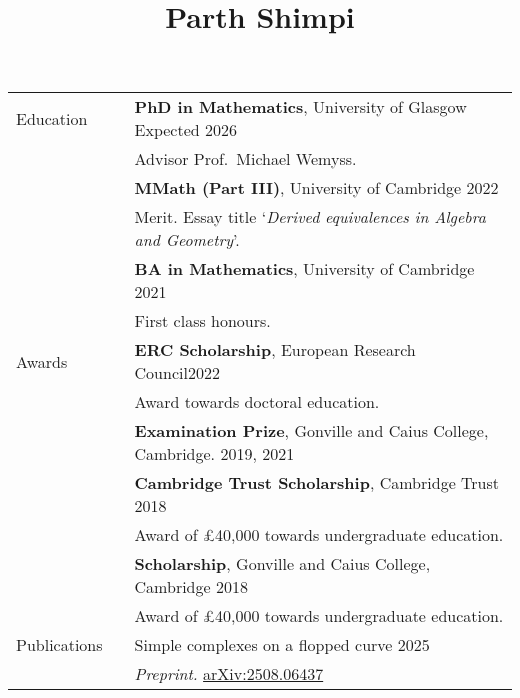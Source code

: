 \documentclass[10pt]{article}
\newcommand{\nextItem}{\\[0.25em]}
\newcommand{\nextSection}{\\[0.5em]}
\begin{document}
\title{Parth Shimpi\normalsize{}
    \raisebox{-0.1em}{\huge\(\vert\)}
    }
%
\date{}
\maketitle
\thispagestyle{fancy}
\vspace{-5.5em}
\begin{longtable}{>{\raggedleft\arraybackslash}p{0.8in}>{}p{0.05in}>{}p{5.7in}}
    Education%
        && \textbf{PhD in Mathematics},
           University of Glasgow
           \hfill Expected 2026 \\
        && Advisor Prof.\ Michael Wemyss. \nextItem
        && \textbf{MMath (Part III)},
           University of Cambridge
           \hfill 2022\\
        && Merit. Essay title `\emph{Derived equivalences in Algebra and
        Geometry}'.
        \nextItem
        && \textbf{BA in Mathematics},
           University of Cambridge
           \hfill 2021\\
        && First class honours.
        \nextSection
    Awards%
        && \textbf{ERC Scholarship}, European Research Council\hfill 2022\\
        && Award towards doctoral education. \nextItem
        && \textbf{Examination Prize}, Gonville and Caius College, Cambridge.
        \hfill 2019, 2021\nextItem
        && \textbf{Cambridge Trust Scholarship}, Cambridge Trust \hfill 2018\\
        && Award of £40,000 towards undergraduate education. \nextItem
        && \textbf{Scholarship}, Gonville and Caius College, Cambridge \hfill 2018\\
        && Award of £40,000 towards undergraduate education. \nextSection
    Publications%
        && Simple complexes on a flopped curve \hfill 2025\\
        && \emph{Preprint.}
        \href{https://arxiv.org/abs/2508.06437}{arXiv:2508.06437}

\end{longtable}
\end{document}
